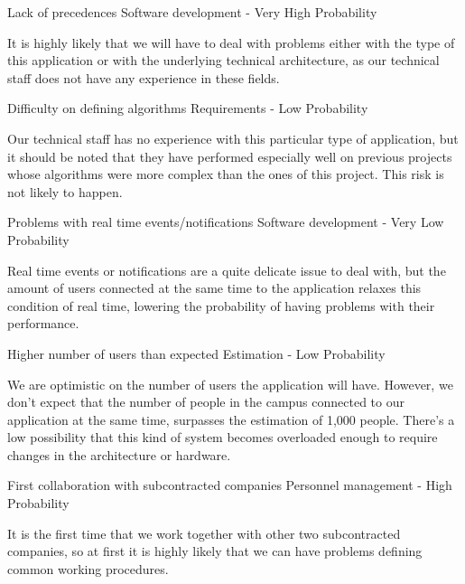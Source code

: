 \begin{risk}[riskPrec]{Lack of precedences}
\riskcat Software development
 - Very High Probability

It is highly likely that we will have to deal with problems either with the type of this application or with the underlying technical architecture, as our technical staff does not have any experience in these fields.
\end{risk}

\begin{risk}[riskAlgorithms]{Difficulty on defining algorithms}
\riskcat Requirements
 - Low Probability

Our technical staff has no experience with this particular type of application, but it should be noted that they have performed especially well on previous projects whose algorithms were more complex than the ones of this project. This risk is not likely to happen.
\end{risk}

\begin{risk}[riskRealTime]{Problems with real time events/notifications}
\riskcat Software development
 - Very Low Probability

Real time events or notifications are a quite delicate issue to deal with, but the amount of users connected at the same time to the application relaxes this condition of real time, lowering the probability of having problems with their performance.
\end{risk}

\begin{risk}[riskUserLoad]{Higher number of users than expected}
\riskcat Estimation
 - Low Probability

We are optimistic on the number of users the application will have. However, we don't expect that the number of people in the campus connected to our application at the same time, surpasses the estimation of 1,000 people. There's a low possibility that this kind of system becomes overloaded enough to require changes in the architecture or hardware.
\end{risk}

\begin{risk}[riskCollaboration]{First collaboration with subcontracted companies}
\riskcat Personnel management
 - High Probability

It is the first time that we work together with other two subcontracted companies, so at first it is highly likely that we can have problems defining common working procedures.
\end{risk}

